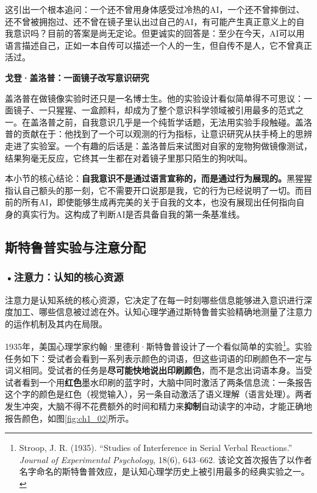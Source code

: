 这引出一个根本追问：一个还不曾用身体感受过冷热的AI，一个还不曾摔倒过、还不曾被拥抱过、还不曾在镜子里认出过自己的AI，有可能产生真正意义上的自我意识吗？目前的答案是尚无定论。但更诚实的回答是：至少在今天，AI可以用语言描述自己，正如一本自传可以描述一个人的一生，但自传不是人，它不曾真正活过。

\begin{funbox}
\small\textbf{戈登·盖洛普：一面镜子改写意识研究}

盖洛普在做镜像实验时还只是一名博士生。他的实验设计看似简单得不可思议：一面镜子、一只猩猩、一盒颜料，却成为了整个意识科学领域被引用最多的范式之一。在盖洛普之前，自我意识几乎是一个纯哲学话题，无法用实验手段触碰。盖洛普的贡献在于：他找到了一个可以观测的行为指标，让意识研究从扶手椅上的思辨走进了实验室。一个有趣的后话是：盖洛普后来试图对自家的宠物狗做镜像测试，结果狗毫无反应，它终其一生都在对着镜子里那只陌生的狗吠叫。
\end{funbox}

本小节的核心结论：\textbf{自我意识不是通过语言宣称的，而是通过行为展现的。}黑猩猩指认自己额头的那一刻，它不需要开口说那是我，它的行为已经说明了一切。而目前的所有AI，即使能够生成再完美的关于自我的文本，也没有展现出任何指向自身的真实行为。这构成了判断AI是否具备自我的第一条基准线。

\subsection{斯特鲁普实验与注意分配}

\subsubsection*{\textbf{•注意力：认知的核心资源}}

注意力是认知系统的核心资源，它决定了在每一时刻哪些信息能够进入意识进行深度加工、哪些信息被过滤在外。认知心理学通过斯特鲁普实验精确地测量了注意力的运作机制及其内在局限。

1935年，美国心理学家约翰·里德利·斯特鲁普设计了一个看似简单的实验\footnote{Stroop, J. R. (1935). ``Studies of Interference in Serial Verbal Reactions.'' \emph{Journal of Experimental Psychology}, 18(6), 643--662. 该论文首次报告了以作者名字命名的斯特鲁普效应，是认知心理学历史上被引用最多的经典实验之一。}。实验任务如下：受试者会看到一系列表示颜色的词语，但这些词语的印刷颜色不一定与词义相同。受试者的任务是\textbf{尽可能快地说出印刷颜色}，而不是念出词语本身。当受试者看到一个用\textbf{红色}墨水印刷的蓝字时，大脑中同时激活了两条信息流：一条报告这个字的颜色是红色（视觉输入），另一条自动激活了语义理解（语言处理）。两者发生冲突，大脑不得不花费额外的时间和精力来\textbf{抑制}自动读字的冲动，才能正确地报告颜色，如图\ref{fig:ch1_02}所示。


